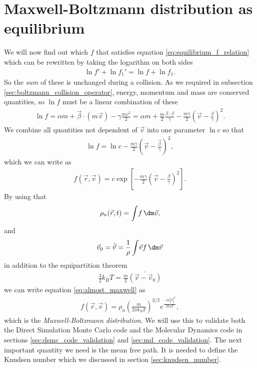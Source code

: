 \section{Maxwell-Boltzmann distribution as equilibrium}
\label{sec:maxwell_boltzmann_distribution}
We will now find out which $f$ that satisfies equation \eqref{eq:equilibrium_f_relation} which can be rewritten by taking the logarithm on both sides
\begin{align}
	\ln f' + \ln f_1' = \ln f + \ln f_1.
\end{align}
So the \textit{sum} of these is unchanged during a collision. As we required in subsection \ref{sec:boltzmann_collision_operator}, energy, momentum and mass are conserved quantities, so $\ln f$ must be a linear combination of these
\begin{align}
	\ln f = \alpha m + \vec \beta\cdot(m\vec v) - \gamma\frac{mv^2}{2} = \alpha m + \frac{m}{2}\frac{\beta\cdot\beta}{\gamma} - \frac{m\gamma}{2}\left(\vec v - \frac{\beta}{\gamma}\right)^2.
\end{align}
We combine all quantities not dependent of $\vec v$ into one parameter $\ln c$ so that
\begin{align}
	\ln f = \ln c - \frac{m\gamma}{2}\left(\vec v - \frac{\vec \beta}{\gamma}\right)^2,
\end{align}
which we can write as
\begin{align}
	\label{eq:almost_maxwell}
	f(\vec r, \vec v) = c\exp\left[-\frac{m\gamma}{2}\left(\vec v - \frac{\beta}{\gamma}\right)^2\right].
\end{align}
By using that 
\begin{align}
	\rho_n(\vec r, t) = \int\!f \,\dm\vec v,
\end{align}
and 
\begin{align}
	\vec v_0 = \bar {\vec v} = \frac{1}{\rho}\int\!\vec v f\,\dm \vec v
\end{align}
in addition to the equipartition theorem
\begin{align}
	\frac{3}{2}k_B T = \frac{m}{2}\bar{(\vec v - \vec v_0)}
\end{align}
we can write equation \eqref{eq:almost_maxwell} as \cite{mclennan1989introduction}
\begin{align}
	\label{eq:maxwell_boltzmann_distribution}
	f(\vec r, \vec v) = \rho_n \left(\frac{m}{2\pi k_B T}\right)^{3/2}e^\frac{-m|\vec v|^2}{2k_BT},
\end{align}
which is the \textit{Maxwell-Boltzmann distribution}. We will use this to validate both the Direct Simulation Monte Carlo code and the Molecular Dynamics code in sections \ref{sec:dsmc_code_validation} and \ref{sec:md_code_validation}. The next important quantity we need is the mean free path. It is needed to define the Knudsen number which we discussed in section \ref{sec:knudsen_number}.
